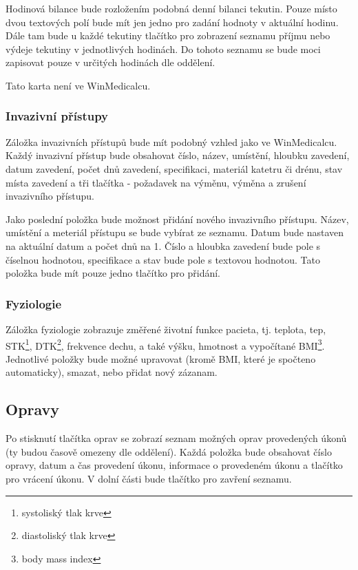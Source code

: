 Hodinová bilance bude rozložením podobná denní bilanci tekutin. Pouze místo dvou textových polí bude mít jen jedno pro zadání hodnoty v aktuální hodinu. Dále tam bude u každé tekutiny tlačítko pro zobrazení seznamu příjmu nebo výdeje tekutiny v jednotlivých hodinách. Do tohoto seznamu se bude moci zapisovat pouze v určitých hodinách dle oddělení.

Tato karta není ve WinMedicalcu.

\subsubsection{Invazivní přístupy}

Záložka invazivních přístupů bude mít podobný vzhled jako ve WinMedicalcu. Každý invazivní přístup bude obsahovat číslo, název, umístění, hloubku zavedení, datum zavedení, počet dnů zavedení, specifikaci, materiál katetru či drénu, stav místa zavedení a tři tlačítka - požadavek na výměnu, výměna a zrušení invazivního přístupu.

Jako poslední položka bude možnost přidání nového invazivního přístupu. Název, umístění a meteriál přístupu se bude vybírat ze seznamu. Datum bude nastaven na aktuální datum a počet dnů na 1. Číslo a hloubka zavedení bude pole s číselnou hodnotou, specifikace a stav bude pole s textovou hodnotou. Tato položka bude mít pouze jedno tlačítko pro přidání.

\subsubsection{Fyziologie}

Záložka fyziologie zobrazuje změřené životní funkce pacieta, tj. teplota, tep, STK\footnote{systoliský tlak krve}, DTK\footnote{diastoliský tlak krve}, frekvence dechu, a také výšku, hmotnost a vypočítané BMI\footnote{body mass index}. Jednotlivé položky bude možné upravovat (kromě BMI, které je spočteno automaticky), smazat, nebo přidat nový zázanam.

\subsection{Opravy}

Po stisknutí tlačítka oprav se zobrazí seznam možných oprav provedených úkonů (ty budou časově omezeny dle oddělení). Každá položka bude obsahovat číslo opravy, datum a čas provedení úkonu, informace o provedeném úkonu a tlačítko pro vrácení úkonu. V dolní části bude tlačítko pro zavření seznamu.